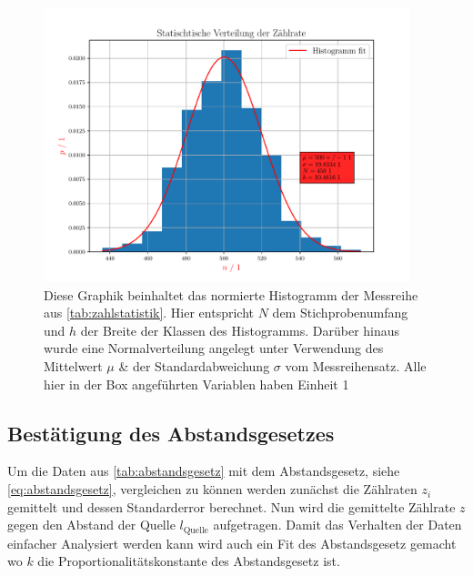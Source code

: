 \documentclass[12pt,english,ngerman]{scrartcl}
\begin{document}
\begin{figure}[H]
  \begin{center}
    \includegraphics[width=0.95\textwidth]{./figures/10statistik.pdf}
  \end{center}
  \caption[Histogramm der Zählstatistik mit Klassen der Größe 10]{Diese Graphik
    beinhaltet das normierte Histogramm der Messreihe aus
    \autoref{tab:zahlstatistik}. Hier entspricht $N$ dem Stichprobenumfang und
    $h$ der Breite der Klassen des Histogramms. Darüber hinaus wurde eine
    Normalverteilung angelegt unter Verwendung des Mittelwert $\mu$ \& der
  Standardabweichung $\sigma$ vom Messreihensatz. Alle hier in der Box
angeführten Variablen haben Einheit 1}
  \label{fig:10statistik}
\end{figure}


\subsection{Bestätigung des Abstandsgesetzes}

Um die Daten aus \autoref{tab:abstandsgesetz} mit dem Abstandsgesetz, siehe
\autoref{eq:abstandsgesetz}, vergleichen zu können werden zunächst die
Zählraten $z_i$ gemittelt und dessen Standarderror berechnet. Nun wird die
gemittelte Zählrate $z$ gegen den Abstand der Quelle $l_{\mathrm{Quelle}}$
aufgetragen. Damit das Verhalten der Daten einfacher Analysiert werden kann
wird auch ein Fit des Abstandsgesetz gemacht wo $k$ die
Proportionalitätskonstante des Abstandsgesetz ist.
\end{document}
